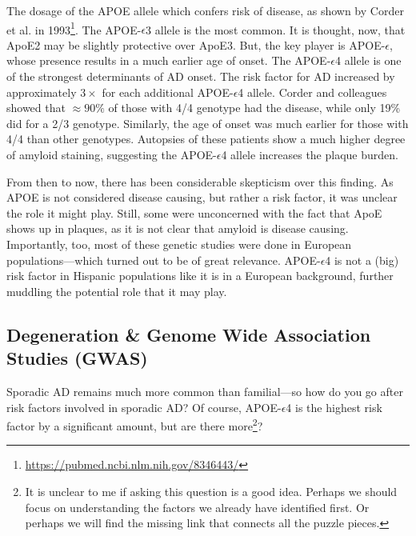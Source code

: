The dosage of the APOE allele which confers risk of disease, as shown by Corder et al. in 1993\footnote{\url{https://pubmed.ncbi.nlm.nih.gov/8346443/}}. The APOE-$\epsilon$3 allele is the most common. It is thought, now, that ApoE2 may be slightly protective over ApoE3. But, the key player is  APOE-$\epsilon$, whose presence results in a much earlier age of onset. The APOE-$\epsilon$4 allele is one of the strongest determinants of AD onset. The risk factor for AD increased by approximately $3\times$ for each additional APOE-$\epsilon$4 allele. Corder and colleagues showed that $\approx 90\%$ of those with 4/4 genotype had the disease, while only 19\% did for a 2/3 genotype. Similarly, the age of onset was much earlier for those with 4/4 than other genotypes. Autopsies of these patients show a much higher degree of amyloid staining, suggesting the APOE-$\epsilon$4 allele increases the plaque burden.\newline 

From then to now, there has been considerable skepticism over this finding. As APOE is not considered disease causing, but rather a risk factor, it was unclear the role it might play. Still, some were unconcerned with the fact that ApoE shows up in plaques, as it is not clear that amyloid is disease causing. Importantly, too, most of these genetic studies were done in European populations---which turned out to be of great relevance. APOE-$\epsilon$4 is not a (big) risk factor in Hispanic populations like it is in a European background, further muddling the potential role that it may play. 


\subsection*{Degeneration \& Genome Wide Association Studies (GWAS)}

Sporadic AD remains much more common than familial---so how do you go after risk factors involved in sporadic AD? Of course, APOE-$\epsilon$4 is the highest risk factor by a significant amount, but are there more\footnote{It is unclear to me if asking this question is a good idea. Perhaps we should focus on understanding the factors we already have identified first. Or perhaps we will find the missing link that connects all the puzzle pieces.}?\newline


